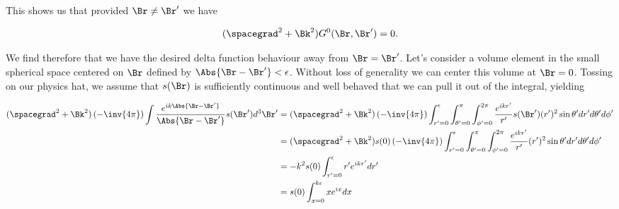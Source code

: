 This shows us that provided $\Br \ne \Br'$ we have

\begin{equation}\label{eqn:helmholtzGreens:n}
(\spacegrad^2 + \Bk^2) G^0(\Br, \Br') = 0.
\end{equation}

We find therefore that we have the desired delta function behaviour away from $\Br = \Br'$.  Let's consider a volume element in the small spherical space centered on $\Br$ defined by $\Abs{\Br - \Br'} < \epsilon$.  Without loss of generality we can center this volume at $\Br = 0$.  Tossing on our physics hat, we assume that $s(\Br)$ is sufficiently continuous and well behaved that we can pull it out of the integral, yielding

\begin{align*}
(\spacegrad^2 + \Bk^2)
\left(
- \inv{4 \pi} 
\right)
\int 
\frac{e^{i k \Abs{\Br - \Br'}} }{\Abs{\Br - \Br'}}
s(\Br') d^3 \Br'
&=
(\spacegrad^2 + \Bk^2)
\left(
- \inv{4 \pi} 
\right)
\int_{r' = 0}^\epsilon
\int_{\theta' = 0}^\pi
\int_{\phi' = 0}^{2 \pi}
\frac{e^{i k r'} }{r'}
s(\Br') 
(r')^2 \sin\theta' dr' d\theta' d\phi' \\
&=
(\spacegrad^2 + \Bk^2)
s(0) 
\left(
- \inv{4 \pi} 
\right)
\int_{r' = 0}^\epsilon
\int_{\theta' = 0}^\pi
\int_{\phi' = 0}^{2 \pi}
\frac{e^{i k r'} }{r'}
(r')^2 \sin\theta' dr' d\theta' d\phi' \\
&=
-k^2
s(0) 
\int_{r' = 0}^\epsilon
r' e^{i k r'} 
dr' \\
&=
s(0) 
\int_{x = 0}^{k \epsilon}
x e^{i x} 
d x \\
\end{align*}


\EndArticle
